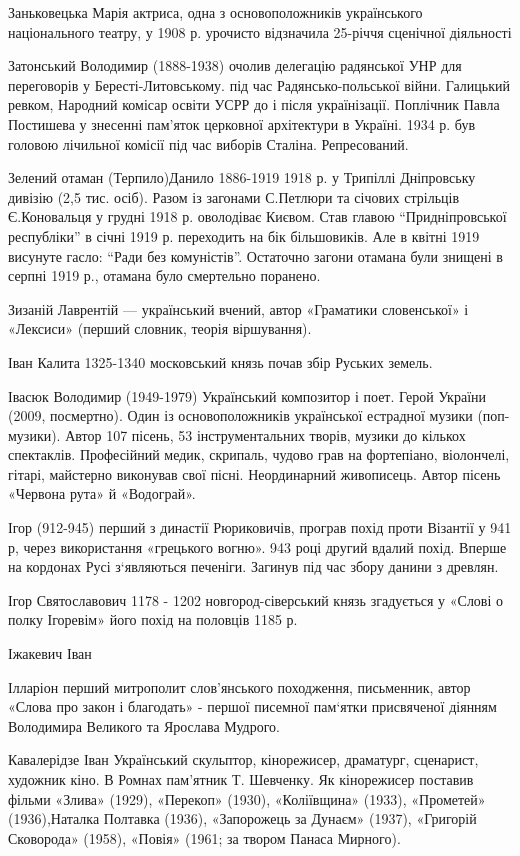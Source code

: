 Заньковецька Марія актриса, одна з основоположників українського національного театру, у 1908 р. урочисто відзначила 25-річчя сценічної діяльності 

Затонський Володимир (1888-1938) очолив делегацію радянської УНР для переговорів у Бересті-Литовському. під час Радянсько-польської війни. Галицький ревком,  Народний комісар освіти УСРР  до і після українізації. Поплічник Павла Постишева у знесенні пам'яток церковної архітектури в Україні. 1934 р. був головою лічильної комісії під час виборів Сталіна. Репресований.

Зелений отаман (Терпило)Данило   1886-1919 1918 р. у Трипіллі Дніпровську дивізію (2,5 тис. осіб). Разом із загонами С.Петлюри та січових стрільців Є.Коновальця у грудні 1918 р. оволодіває Києвом. Став главою “Придніпровської республіки” в січні 1919 р. переходить на бік більшовиків. Але в квітні 1919 висунуте гасло: “Ради без комуністів”. Остаточно загони отамана були знищені в серпні 1919 р., отамана було смертельно поранено. 

Зизаній  Лаврентій --- український вчений, автор «Граматики словенської» і «Лексиси» (перший словник, теорія віршування).

Іван Калита 1325-1340 московський князь почав збір Руських земель.

Івасюк Володимир (1949-1979) Український композитор і поет. Герой України (2009, посмертно). Один із основоположників української естрадної музики (поп-музики). Автор 107 пісень, 53 інструментальних творів, музики до кількох спектаклів. Професійний медик, скрипаль, чудово грав на фортепіано, віолончелі, гітарі, майстерно виконував свої пісні. Неординарний живописець. Автор пісень «Червона рута» й «Водограй».

Ігор (912-945) перший з династії Рюриковичів, програв похід проти Візантії у 941 р, через використання «грецького вогню». 943 році другий вдалий похід. Вперше на кордонах Русі з‘являються печеніги. Загинув під час збору данини з древлян.

Ігор Святославович 1178 - 1202 новгород-сіверський князь згадується у «Слові о полку Ігоревім» його похід на половців 1185 р.

Іжакевич Іван 

Ілларіон перший митрополит слов'янського походження, письменник, автор «Слова про закон і благодать» - першої писемної пам‘ятки присвяченої діянням Володимира Великого та Ярослава Мудрого.

Кавалерідзе Іван Український скульптор, кінорежисер, драматург, сценарист, художник кіно. В Ромнах пам’ятник Т. Шевченку. Як кінорежисер поставив фільми «Злива» (1929), «Перекоп» (1930), «Коліївщина» (1933), «Прометей» (1936),Наталка Полтавка (1936), «Запорожець за Дунаєм» (1937), «Григорій Сковорода» (1958), «Повія» (1961; за твором Панаса Мирного). 

